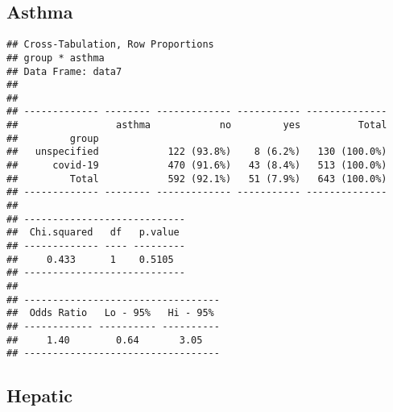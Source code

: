 \documentclass[
]{article}
\newenvironment{Shaded}{\begin{snugshade}}{\end{snugshade}}
\newcommand{\AttributeTok}[1]{\textcolor[rgb]{0.77,0.63,0.00}{#1}}
\newcommand{\ConstantTok}[1]{\textcolor[rgb]{0.00,0.00,0.00}{#1}}
\newcommand{\FunctionTok}[1]{\textcolor[rgb]{0.00,0.00,0.00}{#1}}
\newcommand{\NormalTok}[1]{#1}
\newcommand{\SpecialCharTok}[1]{\textcolor[rgb]{0.00,0.00,0.00}{#1}}
\newcommand{\StringTok}[1]{\textcolor[rgb]{0.31,0.60,0.02}{#1}}
\begin{document}
\hypertarget{asthma}{%
\subsection{Asthma}\label{asthma}}

\begin{Shaded}
\end{Shaded}

\begin{verbatim}
## Cross-Tabulation, Row Proportions  
## group * asthma  
## Data Frame: data7  
## 
## 
## ------------- -------- ------------- ----------- --------------
##                 asthma            no         yes          Total
##         group                                                  
##   unspecified            122 (93.8%)    8 (6.2%)   130 (100.0%)
##      covid-19            470 (91.6%)   43 (8.4%)   513 (100.0%)
##         Total            592 (92.1%)   51 (7.9%)   643 (100.0%)
## ------------- -------- ------------- ----------- --------------
## 
## ----------------------------
##  Chi.squared   df   p.value 
## ------------- ---- ---------
##     0.433      1    0.5105  
## ----------------------------
## 
## ----------------------------------
##  Odds Ratio   Lo - 95%   Hi - 95% 
## ------------ ---------- ----------
##     1.40        0.64       3.05   
## ----------------------------------
\end{verbatim}

\hypertarget{hepatic}{%
\subsection{Hepatic}\label{hepatic}}

\begin{Shaded}
\end{Shaded}
\end{document}
